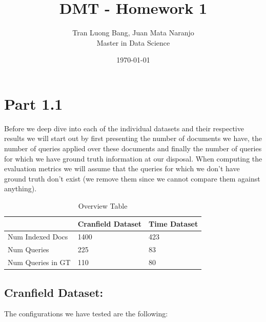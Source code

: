 \documentclass[12pt]{article}
\title{DMT - Homework 1}
\author{
        Tran Luong Bang, Juan Mata Naranjo \\
                Master in Data Science}
\date{\today}
\begin{document}
\maketitle
\newpage

\section{Part 1.1}

Before we deep dive into each of the individual datasets and their respective results we will start out by first presenting the number of documents we have, the number of queries applied over these documents and finally the number of queries for which we have ground truth information at our disposal. When computing the evaluation metrics we will assume that the queries for which we don't have ground truth don't exist (we remove them since we cannot compare them against anything).

\begin{table}[H]
\centering
\begin{tabular}{|l|l|l|}
\hline
                  & Cranfield Dataset & Time Dataset \\ \hline
Num Indexed Docs  & 1400                 & 423            \\ \hline
Num Queries       & 225                 & 83            \\ \hline
Num Queries in GT & 110                 &  80           \\ \hline
\end{tabular}
\caption{Overview Table}
\label{Overview Table}
\end{table}

\subsection{Cranfield Dataset:}

The configurations we have tested are the following:
\end{document}
